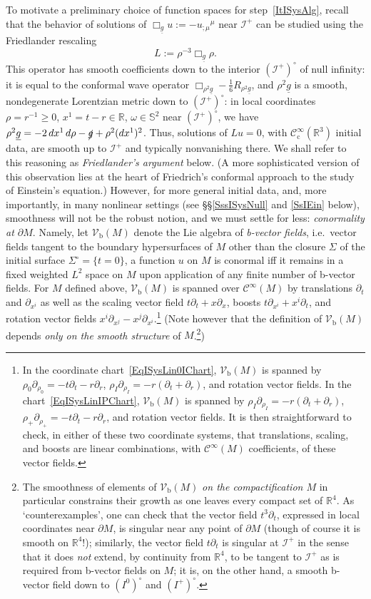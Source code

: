 \documentclass[reqno,11pt,letterpaper]{amsart}
\numberwithin{equation}{section}
\numberwithin{figure}{section}
\theoremstyle{definition}
\theoremstyle{remark}
\newcommand{\mc}{\mathcal}
\newcommand{\cC}{\mc C}
\newcommand{\ms}{\mathscr}
\newcommand{\scri}{\ms I}
\newcommand{\R}{\mathbb{R}}
\newcommand{\Sph}{\mathbb{S}}
\newcommand{\slg}{\slashed{g}{}}
\newcommand{\pa}{\partial}
\newcommand{\ul}[1]{\underline{#1}{}}
\newcommand{\bop}{{\mathrm{b}}}
\newcommand{\cp}{{\mathrm{c}}}
\newcommand{\Vf}{\mathcal V}
\newcommand{\Vb}{\Vf_\bop}
\newcommand{\CI}{\cC^\infty}
\newcommand{\CIc}{\cC^\infty_\cp}
\begin{document}
To motivate a preliminary choice of function spaces for step~\ref{ItISysAlg}, recall that the behavior of solutions of $\Box_{\ul g}u:=-u_{;\mu}{}^\mu$ near $\scri^+$ can be studied using the Friedlander rescaling
\begin{equation}
\label{EqISysLinOp}
  L:=\rho^{-3}\Box_{\ul g}\rho.
\end{equation}
This operator has smooth coefficients down to the interior $(\scri^+)^\circ$ of null infinity: it is equal to the conformal wave operator $\Box_{\rho^2\ul g}-\tfrac{1}{6}R_{\rho^2\ul g}$, and $\rho^2\ul g$ is a smooth, nondegenerate Lorentzian metric down to $(\scri^+)^\circ$: in local coordinates $\rho=r^{-1}\geq 0$, $x^1=t-r\in\R$, $\omega\in\Sph^2$ near $(\scri^+)^\circ$, we have $\rho^2\ul g=-2\,d x^1\,d\rho-\slg+\rho^2(d x^1)^2$. Thus, solutions of $L u=0$, with $\CIc(\R^3)$ initial data, are smooth up to $\scri^+$ and typically nonvanishing there. We shall refer to this reasoning as \emph{Friedlander's argument} below. (A more sophisticated version of this observation lies at the heart of Friedrich's conformal approach \cite{FriedrichConformalFE} to the study of Einstein's equation.) However, for more general initial data, and, more importantly, in many nonlinear settings (see \S\S\ref{SssISysNull} and \ref{SsIEin} below), smoothness will not be the robust notion, and we must settle for less: \emph{conormality at $\pa M$}. Namely, let $\Vb(M)$ denote the Lie algebra of \emph{b-vector fields}, i.e.\ vector fields tangent to the boundary hypersurfaces of $M$ other than the closure $\Sigma$ of the initial surface $\Sigma^\circ=\{t=0\}$, a function $u$ on $M$ is conormal iff it remains in a fixed weighted $L^2$ space on $M$ upon application of any finite number of b-vector fields. For $M$ defined above, $\Vb(M)$ is spanned over $\CI(M)$ by translations $\pa_t$ and $\pa_{x^i}$ as well as the scaling vector field $t\pa_t+x\pa_x$, boosts $t\pa_{x^i}+x^i\pa_t$, and rotation vector fields $x^i\pa_{x^j}-x^j\pa_{x^i}$.\footnote{In the coordinate chart~\eqref{EqISysLin0IChart}, $\Vb(M)$ is spanned by $\rho_0\pa_{\rho_0}=-t\pa_t-r\pa_r$, $\rho_I\pa_{\rho_I}=-r(\pa_t+\pa_r)$, and rotation vector fields. In the chart~\eqref{EqISysLinIPChart}, $\Vb(M)$ is spanned by $\rho_I\pa_{\rho_I}=-r(\pa_t+\pa_r)$, $\rho_+\pa_{\rho_+}=-t\pa_t-r\pa_r$, and rotation vector fields. It is then straightforward to check, in either of these two coordinate systems, that translations, scaling, and boosts are linear combinations, with $\CI(M)$ coefficients, of these vector fields.} (Note however that the definition of $\Vb(M)$ depends \emph{only on the smooth structure} of $M$.\footnote{The smoothness of elements of $\Vb(M)$ \emph{on the compactification $M$} in particular constrains their growth as one leaves every compact set of $\R^4$. As `counterexamples', one can check that the vector field $t^3\pa_t$, expressed in local coordinates near $\pa M$, is singular near any point of $\pa M$ (though of course it is smooth on $\R^4$!); similarly, the vector field $t\pa_t$ is singular at $\scri^+$ in the sense that it does \emph{not} extend, by continuity from $\R^4$, to be tangent to $\scri^+$ as is required from b-vector fields on $M$; it is, on the other hand, a smooth b-vector field down to $(I^0)^\circ$ and $(I^+)^\circ$.})
\end{document}
